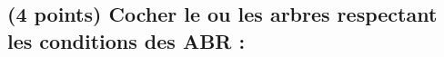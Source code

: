 \documentclass[11pt,a4paper]{article}
\begin{document}
\MakeExamTitle                   %




\renewcommand{\thesubsection}{\arabic{subsection}} %



\vfillFirst

\subsection{(4 points) Cocher le ou les arbres respectant les conditions des ABR : }
\end{document}

